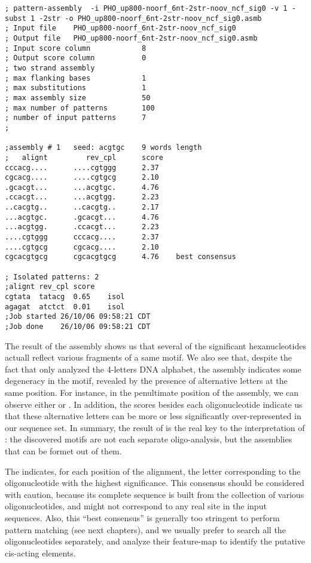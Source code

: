 {\color{OliveGreen} \begin{footnotesize} 
\begin{verbatim}
; pattern-assembly  -i PHO_up800-noorf_6nt-2str-noov_ncf_sig0 -v 1 -subst 1 -2str -o PHO_up800-noorf_6nt-2str-noov_ncf_sig0.asmb
; Input file    PHO_up800-noorf_6nt-2str-noov_ncf_sig0
; Output file   PHO_up800-noorf_6nt-2str-noov_ncf_sig0.asmb
; Input score column            8
; Output score column           0
; two strand assembly
; max flanking bases            1
; max substitutions             1
; max assembly size             50
; max number of patterns        100
; number of input patterns      7
;

;assembly # 1   seed: acgtgc    9 words length 
;   alignt         rev_cpl      score
cccacg....      ....cgtggg      2.37
cgcacg....      ....cgtgcg      2.10
.gcacgt...      ...acgtgc.      4.76
.ccacgt...      ...acgtgg.      2.23
..cacgtg..      ..cacgtg..      2.17
...acgtgc.      .gcacgt...      4.76
...acgtgg.      .ccacgt...      2.23
....cgtggg      cccacg....      2.37
....cgtgcg      cgcacg....      2.10
cgcacgtgcg      cgcacgtgcg      4.76    best consensus

; Isolated patterns: 2
;alignt rev_cpl score
cgtata  tatacg  0.65    isol
agagat  atctct  0.01    isol
;Job started 26/10/06 09:58:21 CDT
;Job done    26/10/06 09:58:21 CDT
\end{verbatim} \end{footnotesize}
}

The result of the assembly shows us that several of the significant
hexanucleotides actuall reflect various fragments of a same motif.  We
also see that, despite the fact that  only
analyzed the 4-letters DNA alphabet, the assembly indicates some
degeneracy in the motif, revealed by the presence of alternative
letters at the same position. For instance, in the penultimate
position of the assembly, we can observe either  or . In
addition, the scores besides each oligonucleotide indicate us that
these alternative letters can be more or less significantly
over-represented in our sequence set. In summary, the result of
 is the real key to the interpretation of
: the discovered motifs are not each separate
oligo-analysis, but the assemblies that can be formet out of them.

The  indicates, for each position of the
alignment, the letter corresponding to the oligonucleotide with the
highest significance. This consensus should be considered with
caution, because its complete sequence is built from the collection of
various oligonucleotides, and might not correspond to any real site in
the input sequences. Also, this ``best consensus'' is generally too
stringent to perform pattern matching (see next chapters), and we
usually prefer to search all the oligonucleotides separately, and
analyze their feature-map to identify the putative cis-acting
elements.

